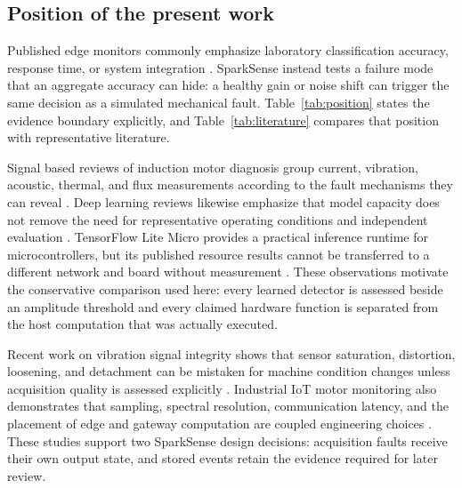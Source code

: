 \documentclass[10pt,twocolumn]{article}
\begin{document}
\subsection{Position of the present work}
Published edge monitors commonly emphasize laboratory classification accuracy, response time, or system integration \cite{arciniegas2025}. SparkSense instead tests a failure mode that an aggregate accuracy can hide: a healthy gain or noise shift can trigger the same decision as a simulated mechanical fault. Table~\ref{tab:position} states the evidence boundary explicitly, and Table~\ref{tab:literature} compares that position with representative literature.

Signal based reviews of induction motor diagnosis group current, vibration, acoustic, thermal, and flux measurements according to the fault mechanisms they can reveal \cite{gangsar2020}. Deep learning reviews likewise emphasize that model capacity does not remove the need for representative operating conditions and independent evaluation \cite{zhao2019}. TensorFlow Lite Micro provides a practical inference runtime for microcontrollers, but its published resource results cannot be transferred to a different network and board without measurement \cite{david2021}. These observations motivate the conservative comparison used here: every learned detector is assessed beside an amplitude threshold and every claimed hardware function is separated from the host computation that was actually executed.

Recent work on vibration signal integrity shows that sensor saturation, distortion, loosening, and detachment can be mistaken for machine condition changes unless acquisition quality is assessed explicitly \cite{kannan2024}. Industrial IoT motor monitoring also demonstrates that sampling, spectral resolution, communication latency, and the placement of edge and gateway computation are coupled engineering choices \cite{magadan2023}. These studies support two SparkSense design decisions: acquisition faults receive their own output state, and stored events retain the evidence required for later review.
\end{document}
